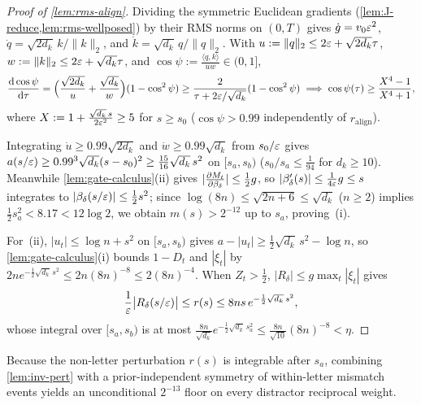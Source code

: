 \begin{proof}[Proof of \cref{lem:rms-align}]
Dividing the symmetric Euclidean gradients (\cref{lem:J-reduce,lem:rms-wellposed}) by their RMS norms on $(0, T)$ gives $\dot g = v_0\varepsilon^2$, $\dot q = \sqrt{2d_k}\,k/\|k\|_2$, and $\dot k = \sqrt{d_k}\,q/\|q\|_2$. With $u := \|q\|_2 \le 2\varepsilon + \sqrt{2d_k}\tau$, $w := \|k\|_2 \le 2\varepsilon + \sqrt{d_k}\tau$, and $\cos\psi := \frac{\langle q,k\rangle}{uw} \in (0,1]$,
\[
  \ddtau{\cos\psi} = \Bigl(\frac{\sqrt{2d_k}}{u} + \frac{\sqrt{d_k}}{w}\Bigr)(1 - \cos^2\psi) \ge \frac{2}{\tau + 2\initscale/\sqrt{d_k}}(1 - \cos^2\psi)
  \implies \cos\psi(\tau) \ge \frac{X^4 - 1}{X^4 + 1},
\]
where $X := 1 + \frac{\sqrt{d_k}\,s}{2\varepsilon^2} \ge 5$ for $s \ge s_0$ ($\cos\psi > 0.99$ independently of $r_{\mathrm{align}}$).

Integrating $\dot u \ge 0.99\sqrt{2d_k}$ and $\dot w \ge 0.99\sqrt{d_k}$ from $s_0/\varepsilon$ gives $a(s/\varepsilon) \ge 0.99^3\sqrt{d_k}(s - s_0)^2 \ge \frac{15}{16}\sqrt{d_k}\,s^2$ on $[s_a, s_b)$ ($s_0/s_a \le \frac{1}{94}$ for $d_k \ge 10$). Meanwhile \cref{lem:gate-calculus}(ii) gives $|\pd{M_t}{\brel_\delta}| \le \frac{1}{2}g$, so $|\beta_\delta'(s)| \le \frac{1}{4\varepsilon}g \le s$ integrates to $|\beta_\delta(s/\varepsilon)| \le \frac{1}{2}s^2$; since $\log(8n) \le \sqrt{2n+6} \le \sqrt{d_k}$ ($n \ge 2$) implies $\frac{1}{2}s_a^2 < 8.17 < 12\log 2$, we obtain $m(s) > 2^{-12}$ up to $s_a$, proving~(i).

For~(ii), $|u_t| \le \log n + s^2$ on $[s_a, s_b)$ gives $a - |u_t| \ge \frac{1}{2}\sqrt{d_k}\,s^2 - \log n$, so \cref{lem:gate-calculus}(i) bounds $1 - D_t$ and $|\xi_t|$ by $2n e^{-\frac{1}{2}\sqrt{d_k}\,s^2} \le 2n(8n)^{-8} \le 2(8n)^{-4}$. When $Z_t > \frac{1}{2}$, $|R_\delta| \le g\max_t|\xi_t|$ gives
\[
  \frac{1}{\varepsilon}\bigl|R_\delta(s/\varepsilon)\bigr| \le r(s) \le 8n s\,e^{-\frac{1}{2}\sqrt{d_k}\,s^2},
\]
whose integral over $[s_a, s_b)$ is at most $\frac{8n}{\sqrt{d_k}}e^{-\frac{1}{2}\sqrt{d_k}\,s_a^2} \le \frac{8n}{\sqrt{10}}(8n)^{-8} < \eta$.
\end{proof}

Because the non-letter perturbation $r(s)$ is integrable after $s_a$, combining \cref{lem:inv-pert} with a prior-independent symmetry of within-letter mismatch events yields an unconditional $2^{-13}$ floor on every distractor reciprocal weight.

